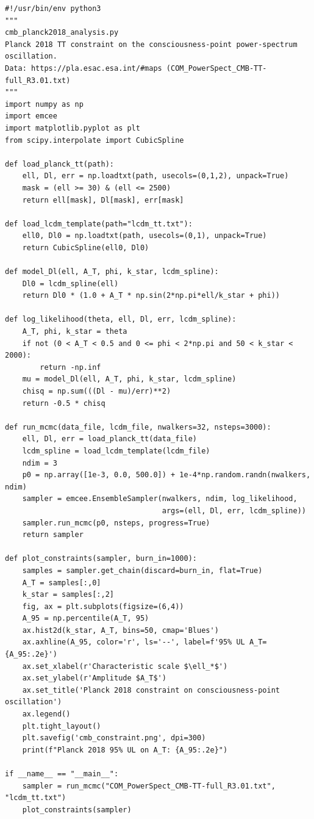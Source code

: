 \documentclass[11pt,a4paper]{article}
\theoremstyle{plain}
\begin{document}
\begin{lstlisting}[title={cmb\_planck2018\_analysis.py}]
#!/usr/bin/env python3
"""
cmb_planck2018_analysis.py
Planck 2018 TT constraint on the consciousness-point power-spectrum oscillation.
Data: https://pla.esac.esa.int/#maps (COM_PowerSpect_CMB-TT-full_R3.01.txt)
"""
import numpy as np
import emcee
import matplotlib.pyplot as plt
from scipy.interpolate import CubicSpline

def load_planck_tt(path):
    ell, Dl, err = np.loadtxt(path, usecols=(0,1,2), unpack=True)
    mask = (ell >= 30) & (ell <= 2500)
    return ell[mask], Dl[mask], err[mask]

def load_lcdm_template(path="lcdm_tt.txt"):
    ell0, Dl0 = np.loadtxt(path, usecols=(0,1), unpack=True)
    return CubicSpline(ell0, Dl0)

def model_Dl(ell, A_T, phi, k_star, lcdm_spline):
    Dl0 = lcdm_spline(ell)
    return Dl0 * (1.0 + A_T * np.sin(2*np.pi*ell/k_star + phi))

def log_likelihood(theta, ell, Dl, err, lcdm_spline):
    A_T, phi, k_star = theta
    if not (0 < A_T < 0.5 and 0 <= phi < 2*np.pi and 50 < k_star < 2000):
        return -np.inf
    mu = model_Dl(ell, A_T, phi, k_star, lcdm_spline)
    chisq = np.sum(((Dl - mu)/err)**2)
    return -0.5 * chisq

def run_mcmc(data_file, lcdm_file, nwalkers=32, nsteps=3000):
    ell, Dl, err = load_planck_tt(data_file)
    lcdm_spline = load_lcdm_template(lcdm_file)
    ndim = 3
    p0 = np.array([1e-3, 0.0, 500.0]) + 1e-4*np.random.randn(nwalkers, ndim)
    sampler = emcee.EnsembleSampler(nwalkers, ndim, log_likelihood,
                                    args=(ell, Dl, err, lcdm_spline))
    sampler.run_mcmc(p0, nsteps, progress=True)
    return sampler

def plot_constraints(sampler, burn_in=1000):
    samples = sampler.get_chain(discard=burn_in, flat=True)
    A_T = samples[:,0]
    k_star = samples[:,2]
    fig, ax = plt.subplots(figsize=(6,4))
    A_95 = np.percentile(A_T, 95)
    ax.hist2d(k_star, A_T, bins=50, cmap='Blues')
    ax.axhline(A_95, color='r', ls='--', label=f'95% UL A_T={A_95:.2e}')
    ax.set_xlabel(r'Characteristic scale $\ell_*$')
    ax.set_ylabel(r'Amplitude $A_T$')
    ax.set_title('Planck 2018 constraint on consciousness-point oscillation')
    ax.legend()
    plt.tight_layout()
    plt.savefig('cmb_constraint.png', dpi=300)
    print(f"Planck 2018 95% UL on A_T: {A_95:.2e}")

if __name__ == "__main__":
    sampler = run_mcmc("COM_PowerSpect_CMB-TT-full_R3.01.txt", "lcdm_tt.txt")
    plot_constraints(sampler)
\end{lstlisting}
\end{document}
